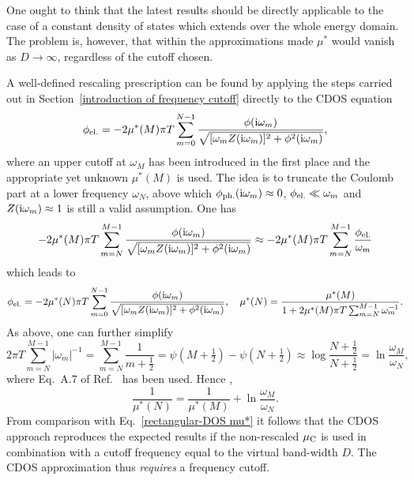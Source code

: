 One ought to think that the latest results should be directly applicable to the
case of a constant density of states which extends over the whole energy domain.
The problem is, however, that within the approximations made $\mu^*$ would
vanish as $D \rightarrow \infty$, regardless of the cutoff chosen.

A well-defined rescaling prescription can be found by applying the steps carried
out in Section~\ref{introduction of frequency cutoff} directly to the CDOS
 equation
%
\begin{equation} \label{approximate constant Coulomb contribution}
    \phi \sb{\text{el.}} = -2 \mu^*(M) \pi T \sum_{m = 0}^{N - 1}
    \frac
        {\phi(\mathrm i \omega_m)}
        {\sqrt{[\omega_m Z(\mathrm i \omega_m)]^2 + \phi^2(\mathrm i \omega_m)}},
\end{equation}
%
where an upper cutoff at $\omega_M$ has been introduced in the first place and
the appropriate yet unknown $\mu^*(M)$ is used. The idea is to truncate the
Coulomb part at a lower frequency $\omega_N$, above which $\phi \sb{\text{ph.}} (\mathrm i
\omega_m) \approx 0$, $\phi \sb{\text{el.}} \ll \omega_m$ and $Z(\mathrm i \omega_m) \approx
1$ is still a valid assumption. One has
%
\begin{equation*}
    -2 \mu^*(M) \pi T \sum_{m = N}^{M - 1}
    \frac
        {\phi(\mathrm i \omega_m)}
        {\sqrt{[\omega_m Z(\mathrm i \omega_m)]^2 + \phi^2(\mathrm i \omega_m)}}
    \approx -2 \mu^*(M) \pi T \sum_{m = N}^{M - 1}
    \frac{\phi \sb{\text{el.}}}{\omega_m}
\end{equation*}
%
which leads to
%
\begin{equation*}
    \phi \sb{\text{el.}} = -2 \mu^*(N) \pi T \sum_{m = 0}^{N - 1}
    \frac
        {\phi(\mathrm i \omega_m)}
        {\sqrt{[\omega_m Z(\mathrm i \omega_m)]^2 + \phi^2(\mathrm i \omega_m)}},
    \quad
    \mu^*(N) = \frac{\mu^*(M)}{1 + 2 \mu^*(M) \pi T
    \sum_{m = N}^{M - 1} \omega_m^{-1}}.
\end{equation*}
%
As above, one can further simplify
%
\begin{equation*}
    2 \pi T \sum_{m = N}^{M - 1} |\omega_m|^{-1}
    = \sum_{m = N}^{M - 1} \frac 1 {m + \frac 1 2}
    = \psi(M + \tfrac 1 2) - \psi(N + \tfrac 1 2)
    \approx \log \frac{N + \frac 1 2}{N + \frac 1 2}
    = \ln \frac{\omega_M}{\omega_N},
\end{equation*}
%
where Eq.~A.7 of Ref.~ has been used. Hence
\cite[Eq.~9.14]{AllenMitrovic82},
%
\begin{equation*}
    \frac 1 {\mu^*(N)} = \frac 1 {\mu^*(M)} + \ln \frac{\omega_M}{\omega_N}.
\end{equation*}
%
From comparison with Eq.~\ref{rectangular-DOS mu*} it follows that the CDOS
approach reproduces the expected results if the non-rescaled $\mu \sb{\text{C}}$ is
used in combination with a cutoff frequency equal to the virtual band-width $D$.
The CDOS approximation thus \emph{requires} a frequency cutoff.

